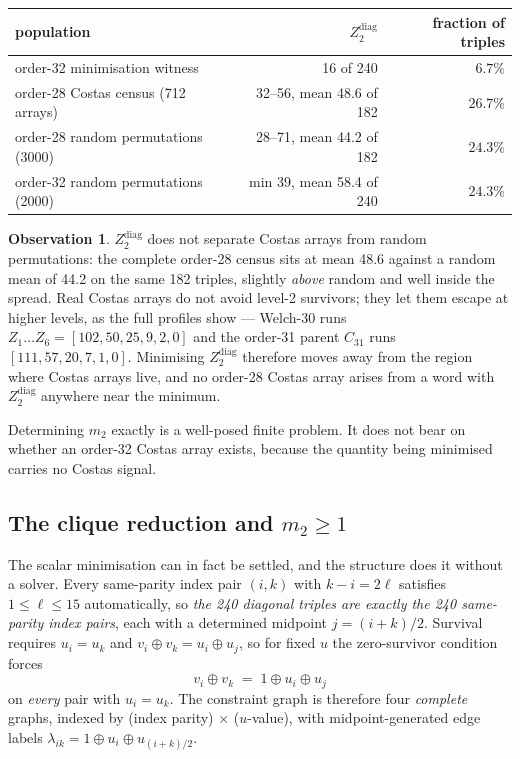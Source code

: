 \documentclass[11pt,a4paper]{article}
\theoremstyle{definition}
\newtheorem{observation}[theorem]{Observation}
\begin{document}
\begin{center}
\begin{tabular}{@{}lrr@{}}
\toprule
population & $Z_2^{\mathrm{diag}}$ & fraction of triples \\
\midrule
order-32 minimisation witness & 16 of 240 & $6.7\%$ \\
order-28 Costas census (712 arrays) & 32--56, mean 48.6 of 182 & $26.7\%$ \\
order-28 random permutations (3000) & 28--71, mean 44.2 of 182 & $24.3\%$ \\
order-32 random permutations (2000) & min 39, mean 58.4 of 240 & $24.3\%$ \\
\bottomrule
\end{tabular}
\end{center}

\begin{observation}
\label{obs:m2}
$Z_2^{\mathrm{diag}}$ does not separate Costas arrays from random permutations:
the complete order-28 census sits at mean 48.6 against a random mean of 44.2 on
the same 182 triples, slightly \emph{above} random and well inside the spread.
Real Costas arrays do not avoid level-2 survivors; they let them escape at higher
levels, as the full profiles show --- Welch-30 runs
$Z_1\ldots Z_6=[102,50,25,9,2,0]$ and the order-31 parent $C_{31}$ runs
$[111,57,20,7,1,0]$. Minimising $Z_2^{\mathrm{diag}}$ therefore moves away from
the region where Costas arrays live, and no order-28 Costas array arises from a
word with $Z_2^{\mathrm{diag}}$ anywhere near the minimum.
\end{observation}

Determining $m_2$ exactly is a well-posed finite problem. It does not bear on
whether an order-32 Costas array exists, because the quantity being minimised
carries no Costas signal.

\subsection{The clique reduction and $m_2\ge1$}

The scalar minimisation can in fact be settled, and the structure does it
without a solver. Every same-parity index pair $(i,k)$ with $k-i=2\ell$ satisfies
$1\le\ell\le15$ automatically, so \emph{the 240 diagonal triples are exactly the
240 same-parity index pairs}, each with a determined midpoint $j=(i+k)/2$.
Survival requires $u_i=u_k$ and $v_i\oplus v_k=u_i\oplus u_j$, so for fixed $u$
the zero-survivor condition forces
\[
v_i\oplus v_k \;=\; 1\oplus u_i\oplus u_j
\]
on \emph{every} pair with $u_i=u_k$. The constraint graph is therefore four
\emph{complete} graphs, indexed by (index parity) $\times$ ($u$-value), with
midpoint-generated edge labels $\lambda_{ik}=1\oplus u_i\oplus u_{(i+k)/2}$.
\end{document}
